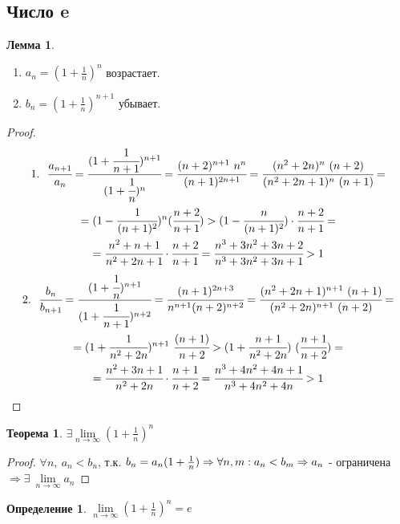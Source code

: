 \documentclass[a4paper, 12pt]{article}
\newcommand\tab[1][.5cm]{\hspace*{#1}}
\newcommand{\lims}{\lim\limits_{n\to \infty}}
\theoremstyle{definition}
\newtheorem*{definition}{Определение}
\newtheorem*{theorem}{Теорема}
\newtheorem*{lemma}{Лемма}
\begin{document}
    \subsection{Число e}
        \begin{lemma} \tab
            \begin{enumerate}
                \item $a_n=(1+\frac{1}{n})^n$ возрастает.
                \item $b_n=(1+\frac{1}{n})^{n+1}$ убывает.
            \end{enumerate}
        \end{lemma} 
        \begin{proof}
            \begin{multline*}
                1.\ \ \cfrac{a_{n+1}}{a_n}=\cfrac{(1+\cfrac{1}{n+1})^{n+1}}{(1+\cfrac{1}{n})^{n}}=\cfrac{(n+2)^{n+1}\ n^n}{(n+1)^{2n+1}}=\cfrac{(n^2+2n)^n\ (n+2)}{(n^2+2n+1)^n\ (n+1)}=
                \\=(1-\cfrac{1}{(n+1)^2})^n (\cfrac{n+2}{n+1})>(1-\cfrac{n}{(n+1)^2})\cdot \cfrac{n+2}{n+1}=\\
                =\cfrac{n^2+n+1}{n^2+2n+1}\cdot \cfrac{n+2}{n+1}=\cfrac{n^3+3n^2+3n+2}{n^3+3n^2+3n+1}>1
            \end{multline*}
            \begin{multline*}
                2.\ \ \cfrac{b_n}{b_{n+1}}=\cfrac{(1+\cfrac{1}{n})^{n+1}}{(1+\cfrac{1}{n+1})^{n+2}}=\cfrac{(n+1)^{2n+3}}{n^{n+1}(n+2)^{n+2}}=\cfrac{(n^2+2n+1)^{n+1}\ (n+1)}{(n^2+2n)^{n+1}\ (n+2)}=\\
                =(1+\cfrac{1}{n^2+2n})^{n+1}\ \cfrac{(n+1)}{n+2}>(1+\cfrac{n+1}{n^2+2n})\ (\cfrac{n+1}{n+2})=\\
                =\cfrac{n^2+3n+1}{n^2+2n}\cdot \cfrac{n+1}{n+2}=\cfrac{n^3+4n^2+4n+1}{n^3+4n^2+4n}>1
            \end{multline*}
        \end{proof} 
        \begin{theorem}
            $\exists \lims (1+\frac{1}{n})^n$
        \end{theorem} 
        \begin{proof}
            $\forall n,\ a_n<b_n$, т.к. $b_n=a_n(1+\frac{1}{n})\Rightarrow \forall n,m: a_n<b_m\\
            \Rightarrow a_n$ - ограничена $\Rightarrow \exists\ \lims a_n$
        \end{proof} 
        \begin{definition}
            $\lims (1+\frac{1}{n})^n=e$
        \end{definition} 
\end{document}
